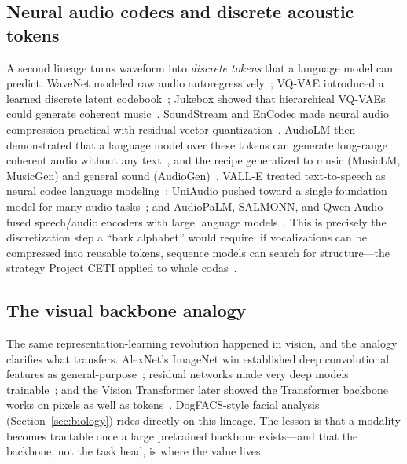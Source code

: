 \subsection{Neural audio codecs and discrete acoustic tokens}
A second lineage turns waveform into \emph{discrete tokens} that a language
model can predict. WaveNet modeled raw audio autoregressively~\cite{vandenoord2016wavenet};
VQ-VAE introduced a learned discrete latent codebook~\cite{vandenoord2017vqvae};
Jukebox showed that hierarchical VQ-VAEs could generate coherent
music~\cite{dhariwal2020jukebox}. SoundStream and EnCodec made neural audio
compression practical with residual vector
quantization~\cite{zeghidour2021soundstream,defossez2022encodec}. AudioLM then
demonstrated that a language model over these tokens can generate long-range
coherent audio without any text~\cite{borsos2023audiolm}, and the recipe
generalized to music (MusicLM, MusicGen) and general sound
(AudioGen)~\cite{agostinelli2023musiclm,copet2023musicgen,kreuk2023audiogen}.
VALL-E treated text-to-speech as neural codec language
modeling~\cite{wang2023valle}; UniAudio pushed toward a single foundation model
for many audio tasks~\cite{yang2024uniaudio}; and AudioPaLM, SALMONN, and
Qwen-Audio fused speech/audio encoders with large language
models~\cite{rubenstein2023audiopalm,tang2024salmonn,chu2024qwenaudio}. This is
precisely the discretization step a ``bark alphabet'' would require: if
vocalizations can be compressed into reusable tokens, sequence models can
search for structure---the strategy Project CETI applied to whale
codas~\cite{sharma2024whale}.

\subsection{The visual backbone analogy}
The same representation-learning revolution happened in vision, and the
analogy clarifies what transfers. AlexNet's ImageNet win established deep
convolutional features as general-purpose~\cite{krizhevsky2012alexnet,deng2009imagenet,russakovsky2015imagenet};
residual networks made very deep models trainable~\cite{he2016resnet}; and the
Vision Transformer later showed the Transformer backbone works on pixels as
well as tokens~\cite{dosovitskiy2021vit}. DogFACS-style facial analysis
(Section~\ref{sec:biology}) rides directly on this lineage. The lesson is that
a modality becomes tractable once a large pretrained backbone exists---and
that the backbone, not the task head, is where the value lives.

